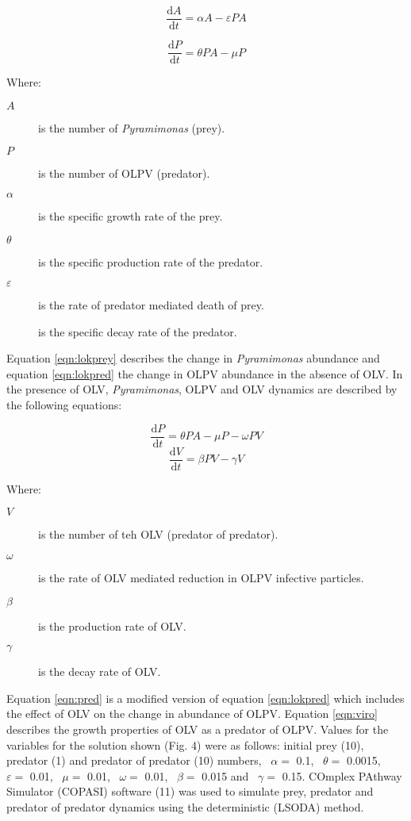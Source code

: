\begin{equation}
\frac{\mathrm{d}A}{\mathrm{d}t}=\alpha A - \varepsilon PA
\label{eqn:lokprey}
\end{equation}

\begin{equation}
\frac{\mathrm{d}P}{\mathrm{d}t}= \theta PA - \mu P
\label{eqn:lokpred}
\end{equation}

Where:
\begin{description}
\item[$A$] is the number of \emph{Pyramimonas} (prey).
\item[$P$] is the number of OLPV (predator).
\item[$\alpha$] is the specific growth rate of the prey.
\item[$\theta$] is the specific production rate of the predator.
\item[$\varepsilon$] is the rate of predator mediated death of prey.
\item[\textmu{}] is the specific decay rate of the predator.
\end{description}

Equation \ref{eqn:lokprey} describes the change in \emph{Pyramimonas} abundance and equation \ref{eqn:lokpred} the change in OLPV abundance in the absence of OLV.
In the presence of OLV, \emph{Pyramimonas}, OLPV and OLV dynamics are described by the following equations:

\begin{equation}
\frac{\mathrm{d}P}{\mathrm{d}t}= \theta PA - \mu P - \omega PV
\label{eqn:pred}
\end{equation}
\begin{equation}
\frac{\mathrm{d}V}{\mathrm{d}t}=\beta PV - \gamma V
\label{eqn:viro}
\end{equation}

Where:
\begin{description}
\item[$V$] is the number of teh OLV (predator of predator).
\item[$\omega$] is the rate of OLV mediated reduction in OLPV infective particles.
\item[$\beta$] is the production rate of OLV.
\item[$\gamma$] is the decay rate of OLV.
\end{description}

Equation \ref{eqn:pred} is a modified version of equation \ref{eqn:lokpred} which includes the effect of OLV on the change in abundance of OLPV.
Equation \ref{eqn:viro} describes the growth properties of OLV as a predator of OLPV.
Values for the variables for the solution shown (Fig. 4) were as follows: initial prey (10), predator (1) and predator of predator (10) numbers, ~$\alpha=$ 0.1, ~$\theta=$ 0.0015, ~$\varepsilon=$ 0.01, ~$\mu=$ 0.01, ~$\omega=$ 0.01, ~$\beta=$ 0.015 and ~$\gamma=$ 0.15. 
COmplex PAthway Simulator (COPASI) software (11) was used to simulate prey, predator and predator of predator dynamics using the deterministic (LSODA) method.


